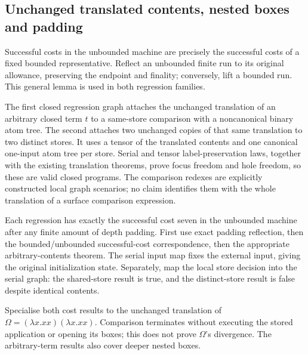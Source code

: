 \subsection{Unchanged translated contents, nested boxes and padding}

Successful costs in the unbounded machine are precisely the successful
costs of a fixed bounded representative. Reflect an unbounded finite run to
its original allowance, preserving the endpoint and finality; conversely,
lift a bounded run. This general lemma is used in both regression families.


The first closed regression graph attaches the unchanged translation of
an arbitrary closed term $t$ to a same-store comparison with a noncanonical
binary atom tree. The second attaches two unchanged copies of that same
translation to two distinct stores. It uses a tensor of the translated
contents and one canonical one-input atom tree per store. Serial and tensor
label-preservation laws, together with the existing translation theorems,
prove focus freedom and hole freedom, so these are valid closed programs.
The comparison redexes are explicitly constructed local graph scenarios;
no claim identifies them with the whole translation of a surface comparison
expression.



Each regression has exactly the successful cost seven in the unbounded
machine after any finite amount of depth padding. First use exact padding
reflection, then the bounded/unbounded successful-cost correspondence, then
the appropriate arbitrary-contents theorem. The serial input map fixes the
external input, giving the original initialization state. Separately, map
the local store decision into the serial graph: the shared-store result is
true, and the distinct-store result is false despite identical contents.





Specialise both cost results to the unchanged translation of
$\Omega=(\lambda x.xx)(\lambda x.xx)$. Comparison terminates without
executing the stored application or opening its boxes; this does not prove
$\Omega$'s divergence. The arbitrary-term results also cover deeper nested boxes.


